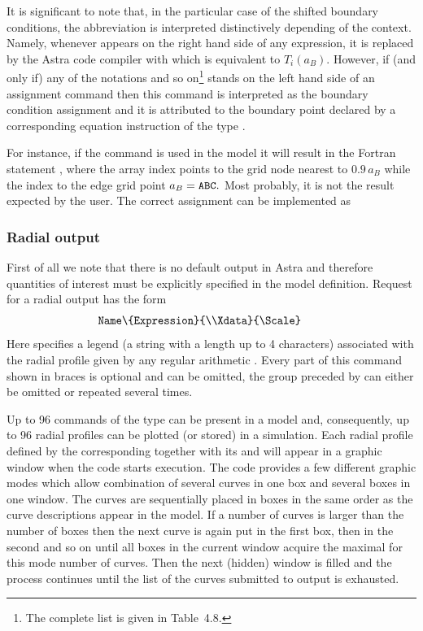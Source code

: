 It is significant to note that, in the particular case of the shifted
boundary conditions, the abbreviation  is interpreted
distinctively depending of the context.
Namely, whenever  appears on the right hand side of any
expression, it is replaced by the Astra code compiler with 
which is equivalent to $T_i(a_B).$ 
However, if (and only if) any of the notations  and so on\footnote{The complete list is given in Table~4.8.} 
stands on the left hand side of an assignment command then this command
is interpreted as the boundary condition assignment and it is attributed
to the boundary point declared by a corresponding equation instruction
of the type . 

For instance, if the command  is used in the model
 it will result in the Fortran statement
, where the array index  points to the
grid node nearest to $0.9\,a_B$ while the index  to the edge
grid point $a_B=\tt ABC.$
Most probably, it is not the result expected by the user.
The correct assignment can be implemented as

\subsubsection{Radial output}
First of all we note that there is no default output in Astra
and therefore quantities of interest must be explicitly specified in the
model definition.
Request for a radial output has the form
\begin{equation}\label{Radout}
\mbox{\tt 
Name\bs\symbol{123}Expression\symbol{125}%
\symbol{123}\bs\bs Xdata\symbol{125}%
\symbol{123}\bs Scale\symbol{125}%
}\qquad
\end{equation}
Here  specifies a legend (a string with a length up to 4
characters) associated with the radial profile given by any regular
arithmetic . 
Every part of this command shown in braces is optional and can be
omitted, the group preceded by \twd{\bs\bs} can either be omitted or 
repeated several times. 

Up to 96 commands of the type  can be present in a model
and, consequently, up to 96 radial profiles can be plotted (or stored)
in a simulation.
Each radial profile defined by the corresponding 
together with its  and  will appear in a graphic
window when the code starts execution.
The code provides a few different graphic modes which allow combination
of several curves in one box and several boxes in one window.
The curves are sequentially placed in boxes in the same order as the
curve descriptions  appear in the model. 
If a number of curves is larger than the number of boxes then the next
curve is again put in the first box, then in the second and so on until
all boxes in the current window acquire the maximal for this mode number
of curves. 
Then the next (hidden) window is filled and the process continues until
the list of the curves submitted to output is exhausted.

